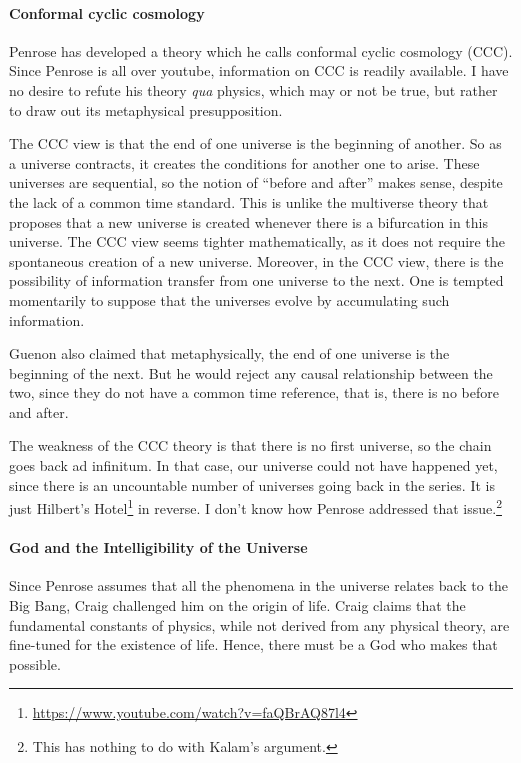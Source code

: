 \paragraph{Conformal cyclic cosmology}


Penrose has developed a theory which he calls conformal cyclic cosmology (CCC). Since Penrose is all over youtube, information on CCC is readily available. I have no desire to refute his theory \emph{qua} physics, which may or not be true, but rather to draw out its metaphysical presupposition.

The CCC view is that the end of one universe is the beginning of another. So as a universe contracts, it creates the conditions for another one to arise. These universes are sequential, so the notion of ``before and after'' makes sense, despite the lack of a common time standard. This is unlike the multiverse theory that proposes that a new universe is created whenever there is a bifurcation in this universe. The CCC view seems tighter mathematically, as it does not require the spontaneous creation of a new universe. Moreover, in the CCC view, there is the possibility of information transfer from one universe to the next. One is tempted momentarily to suppose that the universes evolve by accumulating such information.

Guenon also claimed that metaphysically, the end of one universe is the beginning of the next. But he would reject any causal relationship between the two, since they do not have a common time reference, that is, there is no before and after.

The weakness of the CCC theory is that there is no first universe, so the chain goes back ad infinitum. In that case, our universe could not have happened yet, since there is an uncountable number of universes going back in the series. It is just Hilbert's Hotel\footnote{\url{https://www.youtube.com/watch?v=faQBrAQ87l4}} in reverse. I don't know how Penrose addressed that issue.\footnote{This has nothing to do with Kalam's argument.}

\paragraph{God and the Intelligibility of the Universe}


Since Penrose assumes that all the phenomena in the universe relates back to the Big Bang, Craig challenged him on the origin of life. Craig claims that the fundamental constants of physics, while not derived from any physical theory, are fine-tuned for the existence of life. Hence, there must be a God who makes that possible.

